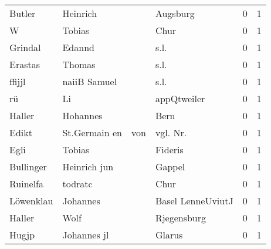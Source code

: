 \begin{center}
\begin{tiny}
\begin{longtabu}{llllrr}
                   Butler &                           Heinrich &             &                                    Augsburg &          0 &         1 \\
                        W &                             Tobias &             &                                        Chur &          0 &         1 \\
                  Grindal &                             Edannd &             &                                        s.l. &          0 &         1 \\
                  Erastas &                             Thomas &             &                                        s.l. &          0 &         1 \\
                   ffijjl &                       naiiB Samuel &             &                                        s.l. &          0 &         1 \\
                       rü &                                 Li &             &                                 appQtweiler &          0 &         1 \\
                   Haller &                           Hohannes &             &                                        Bern &          0 &         1 \\
                    Edikt &                      St.Germain en &         von &                                   vgl. Nr.  &          0 &         1 \\
                     Egli &                             Tobias &             &                                     Fideris &          0 &         1 \\
                Bullinger &                       Heinrich jun &             &                                      Gappel &          0 &         1 \\
                 Ruinelfa &                            todratc &             &                                        Chur &          0 &         1 \\
                Löwenklau &                           Johannes &             &                           Basel LenneUviutJ &          0 &         1 \\
                   Haller &                               Wolf &             &                                 Rjegensburg &          0 &         1 \\
                    Hugjp &                        Johannes jl &             &                                      Glarus &          0 &         1 \\

\end{longtabu}
\end{tiny}
\end{center}

